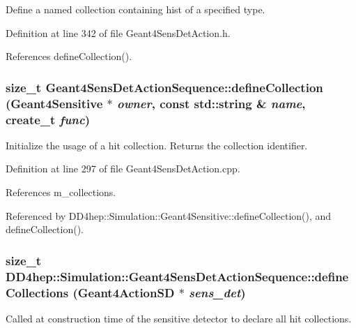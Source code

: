 Define a named collection containing hist of a specified type. 

Definition at line 342 of file Geant4SensDetAction.h.

References defineCollection().\hypertarget{class_d_d4hep_1_1_simulation_1_1_geant4_sens_det_action_sequence_af610d10bd4b9a699b7d8b4179b0de946}{
\subsubsection[{defineCollection}]{\setlength{\rightskip}{0pt plus 5cm}size\_\-t Geant4SensDetActionSequence::defineCollection ({\bf Geant4Sensitive} $\ast$ {\em owner}, \/  const std::string \& {\em name}, \/  {\bf create\_\-t} {\em func})}}
\label{class_d_d4hep_1_1_simulation_1_1_geant4_sens_det_action_sequence_af610d10bd4b9a699b7d8b4179b0de946}


Initialize the usage of a hit collection. Returns the collection identifier. 

Definition at line 297 of file Geant4SensDetAction.cpp.

References m\_\-collections.

Referenced by DD4hep::Simulation::Geant4Sensitive::defineCollection(), and defineCollection().\hypertarget{class_d_d4hep_1_1_simulation_1_1_geant4_sens_det_action_sequence_a6b123f2232b47f787478fd744898ab0e}{
\subsubsection[{defineCollections}]{\setlength{\rightskip}{0pt plus 5cm}size\_\-t DD4hep::Simulation::Geant4SensDetActionSequence::defineCollections ({\bf Geant4ActionSD} $\ast$ {\em sens\_\-det})}}
\label{class_d_d4hep_1_1_simulation_1_1_geant4_sens_det_action_sequence_a6b123f2232b47f787478fd744898ab0e}


Called at construction time of the sensitive detector to declare all hit collections. 

